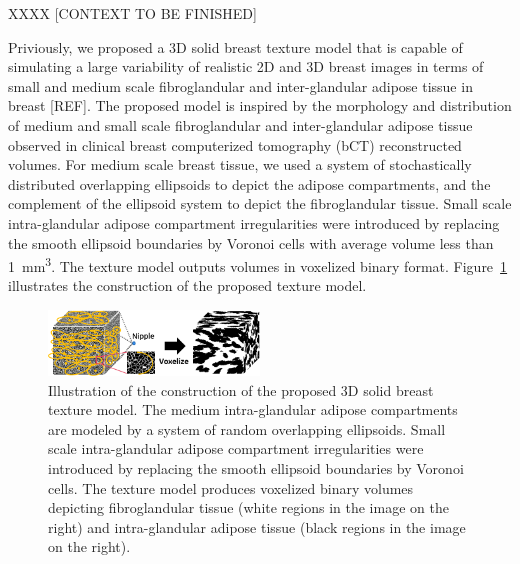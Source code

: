 \documentclass[journal]{IEEEtran}
\begin{document}
XXXX [CONTEXT TO BE FINISHED]


Priviously, we proposed a 3D solid breast texture model that is
capable of simulating a large variability of realistic 2D and 3D
breast images in terms of small and medium scale fibroglandular and
inter-glandular adipose tissue in breast [REF]. The proposed model is
inspired by the morphology and distribution of medium and small scale
fibroglandular and inter-glandular adipose tissue observed in clinical
breast computerized tomography (bCT) reconstructed volumes. For medium
scale breast tissue, we used a system of stochastically distributed
overlapping ellipsoids to depict the adipose compartments, and the
complement of the ellipsoid system to depict the fibroglandular
tissue. Small scale intra-glandular adipose compartment irregularities
were introduced by replacing the smooth ellipsoid boundaries by
Voronoi cells with average volume less than \SI{1}{\mm\cubed}. The
texture model outputs volumes in voxelized binary
format. Figure~\ref{fig:model} illustrates the construction of the
proposed texture model.

\begin{figure}[!htbp]
  \centering
  \includegraphics[width=0.5\textwidth]{model}
  \caption{Illustration of the construction of the proposed 3D solid
    breast texture model. The medium intra-glandular adipose
    compartments are modeled by a system of random overlapping
    ellipsoids. Small scale intra-glandular adipose compartment
    irregularities were introduced by replacing the smooth ellipsoid
    boundaries by Voronoi cells. The texture model produces voxelized
    binary volumes depicting fibroglandular tissue (white regions in
    the image on the right) and intra-glandular adipose tissue (black
    regions in the image on the right).}
  \label{fig:model}
\end{figure}
\end{document}
